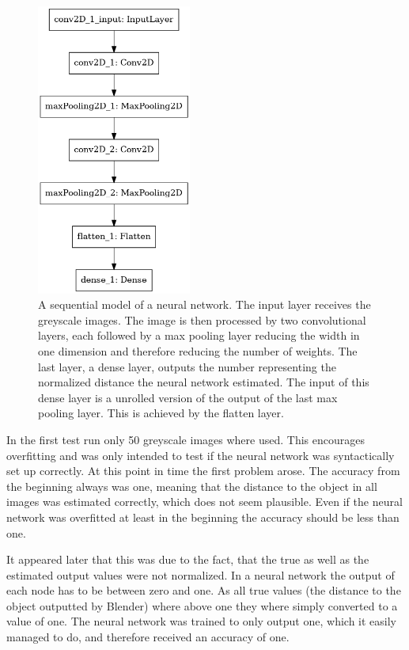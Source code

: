 \begin{figure}[h!]
	\centering
	\includegraphics[width=2in]{img/implementation_neuralNetwork_testringTheStructureOfTheNeuralNetwork_model.png}
	\caption{A sequential model of a neural network. The input layer receives the greyscale images. The image is then processed by two convolutional layers, each followed by a max pooling layer reducing the width in one dimension and therefore reducing the number of weights. The last layer, a dense layer, outputs the number representing the normalized distance the neural network estimated. The input of this dense layer is a unrolled version of the output of the last max pooling layer. This is achieved by the flatten layer.}
	\label{pic:implementation_neuralNetwork_testringTheStructureOfTheNeuralNetwork_model}
\end{figure}

In the first test run only 50 greyscale images where used. This encourages overfitting and was only intended to test if the neural network was syntactically set up correctly. At this point in time the first problem arose. The accuracy from the beginning always was one, meaning that the distance to the object in all images was estimated correctly, which does not seem plausible. Even if the neural network was overfitted at least in the beginning the accuracy should be less than one.

It appeared later that this was due to the fact, that the true as well as the estimated output values were not normalized. In a neural network the output of each node has to be between zero and one. As all true values (the distance to the object outputted by Blender) where above one they where simply converted to a value of one. The neural network was trained to only output one, which it easily managed to do, and therefore received an accuracy of one.

